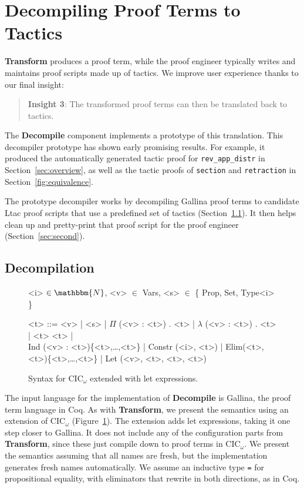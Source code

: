 \section{Decompiling Proof Terms to Tactics}
\label{sec:decompiler}

\textbf{Transform} produces a proof term,
while the proof engineer typically writes and maintains proof scripts made up of tactics.
We improve user experience thanks to our final insight:

\begin{quote}
\textbf{Insight 3}: The transformed proof terms can then be translated back to tactics.
\end{quote}

The \textbf{Decompile} component implements a prototype of this translation.
This decompiler prototype has shown early promising results.
For example, it produced the automatically generated tactic proof for \lstinline{rev_app_distr} 
in Section~\ref{sec:overview}, as well as the tactic proofs of \lstinline{section}
and \lstinline{retraction} in Section~\ref{fig:equivalence}.

The prototype decompiler works by decompiling Gallina proof terms to candidate Ltac proof scripts that 
use a predefined set of tactics (Section~\ref{sec:first}).
It then helps clean up and pretty-print that proof script for the proof engineer (Section~\ref{sec:second}).

\subsection{Decompilation}
\label{sec:first}

\begin{figure}
\small
\begin{grammar}
<i> $\in \mathbbm{N}$, <v> $\in$ Vars, <s> $\in$ \{ Prop, Set, Type<i> \}

<t> ::= <v> | <s> | $\Pi$ (<v> : <t>) . <t> | $\lambda$ (<v> : <t>) . <t> | <t> <t> | \\
Ind (<v> : <t>)\{<t>,\ldots,<t>\} | Constr (<i>, <t>) | Elim(<t>, <t>)\{<t>,\ldots,<t>\} | Let (<v>, <t>, <t>, <t>)
\end{grammar}
\caption{Syntax for CIC$_{\omega}$ extended with let expressions.}
\label{fig:gallinasyntax}
\end{figure}

The input language for the implementation of \textbf{Decompile} is Gallina, the proof term language in Coq.
As with \textbf{Transform}, we present the semantics using an extension of CIC$_{\omega}$ (Figure~\ref{fig:gallinasyntax}).
The extension adds let expressions, taking it one step closer to Gallina.
It does not include any of the configuration parts from \textbf{Transform}, since these just compile down to proof terms in CIC$_{\omega}$.
We present the semantics assuming that all names are fresh, but the implementation generates fresh names automatically.
We assume an inductive type \lstinline{=} for propositional equality,
with eliminators that rewrite in both directions, as in Coq.

